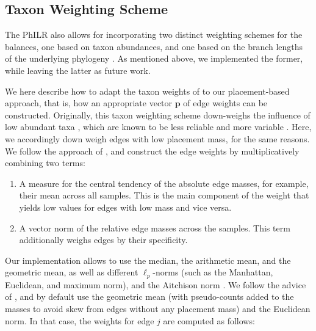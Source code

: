 

\subsection{Taxon Weighting Scheme}
\label{ch:Balances:sec:Methods:sub:EdgeWeights}

The PhILR also allows for incorporating two distinct weighting schemes for the balances,
one based on taxon abundances, and one based on the branch lengths of the underlying phylogeny \cite{Silverman2017}.
As mentioned above, we implemented the former, while leaving the latter as future work.

We here describe how to adapt the taxon weights of \cite{Silverman2017} to our placement-based approach,
that is, how an appropriate vector $\bm{p}$ of edge weights can be constructed.
Originally, this taxon weighting scheme down-weighs the influence of low abundant taxa \cite{Silverman2017},
which are known to be less reliable and more variable \cite{Good1956}.
Here, we accordingly down weigh edges with low placement mass, for the same reasons.
We follow the approach of \cite{Silverman2017}, and construct the edge weights by multiplicatively combining two terms:

\begin{enumerate}
    \item A measure for the central tendency of the absolute edge masses, for example, their mean across all samples.
          This is the main component of the weight that yields low values for edges with low mass and vice versa.
    \item A vector norm of the relative edge masses across the samples.
          This term additionally weighs edges by their specificity.
\end{enumerate}

Our implementation allows to use the median, the arithmetic mean, and the geometric mean,
as well as different $\ell_p$-norms (such as the Manhattan, Euclidean, and maximum norm),
and the Aitchison norm \cite{Pawlowsky-Glahn2015}.
We follow the advice of \cite{Silverman2017}, and by default use the geometric mean
(with pseudo-counts added to the masses to avoid skew from edges without any placement mass) and the Euclidean norm.
In that case, the weights for edge $j$ are computed as follows:

